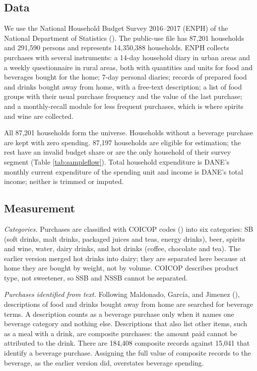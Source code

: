 \documentclass[
  11pt,
]{article}
\begin{document}
\subsection{Data}\label{data}

We use the National Household Budget Survey 2016--2017 (ENPH) of the
National Department of Statistics
(). The public-use file has 87,201 households and
291,590 persons and represents 14,350,388 households. ENPH collects
purchases with several instruments: a 14-day household diary in urban
areas and a weekly questionnaire in rural areas, both with quantities
and units for food and beverages bought for the home; 7-day personal
diaries; records of prepared food and drinks bought away from home, with
a free-text description; a list of food groups with their usual purchase
frequency and the value of the last purchase; and a monthly-recall
module for less frequent purchases, which is where spirits and wine are
collected.

All 87,201 households form the universe. Households without a beverage
purchase are kept with zero spending. 87,197 households are eligible for
estimation; the rest have an invalid budget share or are the only
household of their survey segment (Table \ref{tab:sampleflow}). Total
household expenditure is DANE's monthly current expenditure of the
spending unit and income is DANE's total income; neither is trimmed or
imputed.

\subsection{Measurement}\label{measurement}

\emph{Categories.} Purchases are classified with COICOP codes
() into six categories:
SB (soft drinks, malt drinks, packaged juices and teas, energy drinks),
beer, spirits and wine, water, dairy drinks, and hot drinks (coffee,
chocolate and tea). The earlier version merged hot drinks into dairy;
they are separated here because at home they are bought by weight, not
by volume. COICOP describes product type, not sweetener, so SSB and NSSB
cannot be separated.

\emph{Purchases identified from text.} Following Maldonado, García, and
Jimenez (),
descriptions of food and drinks bought away from home are searched for
beverage terms. A description counts as a beverage purchase only when it
names one beverage category and nothing else. Descriptions that also
list other items, such as a meal with a drink, are composite purchases:
the amount paid cannot be attributed to the drink. There are 184,408
composite records against 15,041 that identify a beverage purchase.
Assigning the full value of composite records to the beverage, as the
earlier version did, overstates beverage spending.
\end{document}
